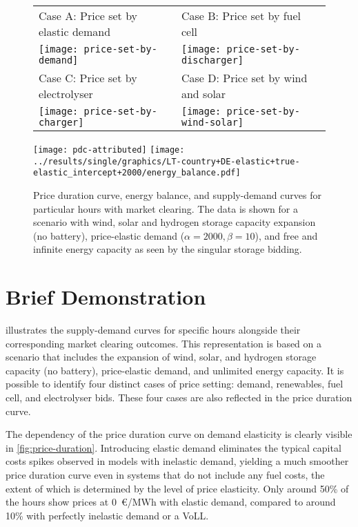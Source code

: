 \documentclass[final,3p]{elsarticle}
\begin{document}
\begin{figure}
	\footnotesize\sffamily
	\begin{tabular}{ll}
		Case A: Price set by elastic demand & Case B: Price set by fuel cell \\
		\texttt{[image: price-set-by-demand]} &
		\texttt{[image: price-set-by-discharger]} \\
		Case C: Price set by electrolyser & Case D: Price set by wind and solar \\
		\texttt{[image: price-set-by-charger]} &
		\texttt{[image: price-set-by-wind-solar]} \\
	\end{tabular}
	\centering
	\texttt{[image: pdc-attributed]}
	\texttt{[image: ../results/single/graphics/LT-country+DE-elastic+true-elastic\_intercept+2000/energy\_balance.pdf]}
	\caption{Price duration curve, energy balance, and supply-demand curves for particular hours with market clearing. The data is shown for a scenario with wind, solar and hydrogen storage capacity expansion (no battery), price-elastic demand ($\alpha=2000, \beta=10$), and free and infinite energy capacity as seen by the singular storage bidding. }
	\label{fig:supply-demand}
\end{figure}


\section*{Brief Demonstration}



 illustrates the supply-demand curves for specific hours
alongside their corresponding market clearing outcomes. This representation is
based on a scenario that includes the expansion of wind, solar, and hydrogen
storage capacity (no battery), price-elastic demand, and unlimited energy
capacity. It is possible to identify four distinct cases of price setting:
demand, renewables, fuel cell, and electrolyser bids. These four cases are also
reflected in the price duration curve.

The dependency of the price duration curve on demand elasticity is clearly
visible in \cref{fig:price-duration}. Introducing elastic demand eliminates the
typical capital costs spikes observed in models with inelastic demand, yielding
a much smoother price duration curve even in systems that do not include any
fuel costs, the extent of which is determined by the level of price elasticity.
Only around 50\% of the hours show prices at 0~\euro/MWh with elastic demand,
compared to around 10\% with perfectly inelastic demand or a VoLL. 
\end{document}
